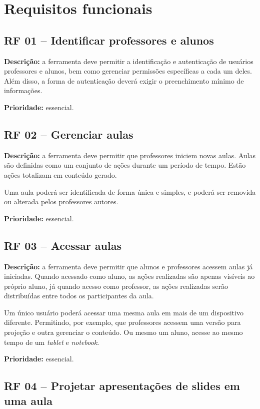 \section{Requisitos funcionais}

\subsection{RF 01 – Identificar professores e alunos}

\textbf{Descrição:} a ferramenta deve permitir a identificação e autenticação de usuários professores e alunos, bem como gerenciar permissões específicas a cada um deles. Além disso, a forma de autenticação deverá exigir o preenchimento mínimo de informações.

\textbf{Prioridade:} essencial.

\subsection{RF 02 – Gerenciar aulas}

\textbf{Descrição:} a ferramenta deve permitir que professores iniciem novas aulas. Aulas são definidas como um conjunto de ações durante um período de tempo. Estão ações totalizam em conteúdo gerado.

Uma aula poderá ser identificada de forma única e simples, e poderá ser removida ou alterada pelos professores autores.

\textbf{Prioridade:} essencial.

\subsection{RF 03 – Acessar aulas}

\textbf{Descrição:} a ferramenta deve permitir que alunos e professores acessem aulas já iniciadas. Quando acessado como aluno, as ações realizadas são apenas visíveis ao próprio aluno, já quando acesso como professor, as ações realizadas serão distribuídas entre todos os participantes da aula.

Um único usuário poderá acessar uma mesma aula em mais de um dispositivo diferente. Permitindo, por exemplo, que professores acessem uma versão para projeção e outra gerenciar o conteúdo. Ou mesmo um aluno, acesse ao mesmo tempo de um \emph{tablet} e \emph{notebook}.

\textbf{Prioridade:} essencial.

\subsection{RF 04 – Projetar apresentações de slides em uma aula}


